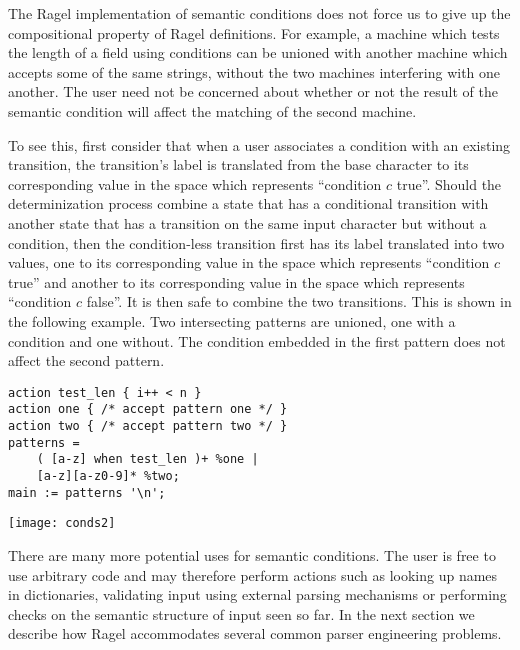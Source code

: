\documentclass[letterpaper,11pt,oneside]{book}
\newcommand{\graphspace}{\vspace{10pt}}
\newenvironment{inline_code}{\def\baselinestretch{1}\vspace{12pt}\small}{}
\begin{document}
The Ragel implementation of semantic conditions does not force us to give up the
compositional property of Ragel definitions. For example, a machine which tests
the length of a field using conditions can be unioned with another machine
which accepts some of the same strings, without the two machines interfering with
one another. The user need not be concerned about whether or not the result of the
semantic condition will affect the matching of the second machine.

To see this, first consider that when a user associates a condition with an
existing transition, the transition's label is translated from the base character
to its corresponding value in the space which represents ``condition $c$ true''. Should
the determinization process combine a state that has a conditional transition
with another state that has a transition on the same input character but
without a condition, then the condition-less transition first has its label
translated into two values, one to its corresponding value in the space which
represents ``condition $c$ true'' and another to its corresponding value in the
space which represents ``condition $c$ false''. It
is then safe to combine the two transitions. This is shown in the following
example.  Two intersecting patterns are unioned, one with a condition and one
without. The condition embedded in the first pattern does not affect the second
pattern.

\begin{inline_code}
\begin{verbatim}
action test_len { i++ < n }
action one { /* accept pattern one */ }
action two { /* accept pattern two */ }
patterns = 
    ( [a-z] when test_len )+ %one |
    [a-z][a-z0-9]* %two;
main := patterns '\n';
\end{verbatim}
\end{inline_code}

\begin{center}
\texttt{[image: conds2]}
\end{center}
\graphspace

There are many more potential uses for semantic conditions. The user is free to
use arbitrary code and may therefore perform actions such as looking up names
in dictionaries, validating input using external parsing mechanisms or
performing checks on the semantic structure of input seen so far. In the
next section we describe how Ragel accommodates several common parser
engineering problems.
\end{document}
